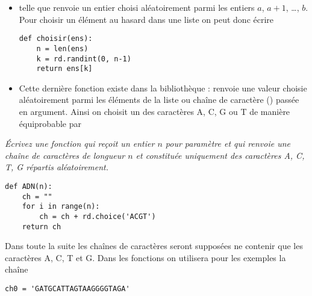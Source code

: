 \begin{itemize}
    \item {} telle que  renvoie un entier choisi aléatoirement parmi les entiers $a$, $a+1$, \ldots, $b$.
    Pour choisir un élément au hasard dans une liste on peut donc écrire
\begin{lstlisting}
def choisir(ens):
    n = len(ens)
    k = rd.randint(0, n-1)
    return ens[k]
\end{lstlisting}
    \item Cette dernière fonction existe dans la bibliothèque :  renvoie une valeur choisie aléatoirement parmi les éléments de la liste ou chaîne de caractère () passée en argument. Ainsi on choisit un des caractères A, C, G ou T de manière équiprobable par 
\end{itemize}
\newpage
\begin{Exercise}[title = Génération]\it 
Écrivez une fonction  qui reçoit un entier $n$ pour paramètre et qui renvoie une chaîne de caractères  de longueur $n$ et constituée uniquement des caractères A, C, T, G répartis aléatoirement.
\end{Exercise}
\begin{Answer}
\begin{lstlisting}
def ADN(n):
    ch = ""
    for i in range(n):
        ch = ch + rd.choice('ACGT')
    return ch
\end{lstlisting}
\end{Answer}
Dans toute la suite les chaînes de caractères seront supposées ne contenir que les caractères A, C, T et G. Dans les fonctions on utilisera pour les exemples la chaîne 
\begin{lstlisting}
ch0 = 'GATGCATTAGTAAGGGGTAGA'
\end{lstlisting}


